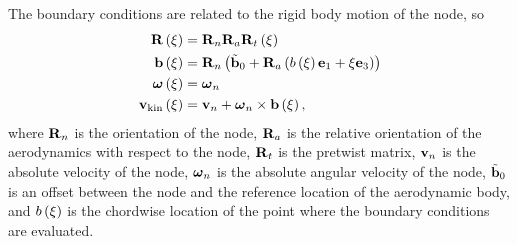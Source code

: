 The boundary conditions are related to the rigid body motion
of the node, so
\begin{subequations}
\begin{align}
	\bm{\mathbf{R}}\left( \xi \right)
	&=
	\bm{\mathbf{R}}_n \bm{\mathbf{R}}_a \bm{\mathbf{R}}_t\left( \xi \right)
	\\
	\bm{\mathbf{b}}\left( \xi \right)
	&=
	\bm{\mathbf{R}}_n\left( 
		\tilde{\bm{\mathbf{b}}}_0
		+ \bm{\mathbf{R}}_a \left( 
			b\left( \xi \right) \bm{\mathbf{e}}_1
			+ \xi \bm{\mathbf{e}}_3
		 \right)
	 \right)
	\\
	\bm{\mathbf{\omega}}\left( \xi \right)
	&=
	\bm{\mathbf{\omega}}_n
	\\
	\bm{\mathbf{v}}_{\text{kin}}\left( \xi \right)
	&=
	\bm{\mathbf{v}}_n + \bm{\mathbf{\omega}}_n \times \bm{\mathbf{b}}\left( \xi \right)
	,
\end{align}
\end{subequations}
where
$\bm{\mathbf{R}}_n$ is the orientation of the node,
$\bm{\mathbf{R}}_a$ is the relative orientation of the aerodynamics
with respect to the node,
$\bm{\mathbf{R}}_t$ is the pretwist matrix,
$\bm{\mathbf{v}}_n$ is the absolute velocity of the node,
$\bm{\mathbf{\omega}}_n$ is the absolute angular velocity of the node,
$\tilde{\bm{\mathbf{b}}}_0$ is an offset between the node and the reference location
of the aerodynamic body,
and $b\left( \xi \right)$ is the chordwise location of the point
where the boundary conditions are evaluated.

